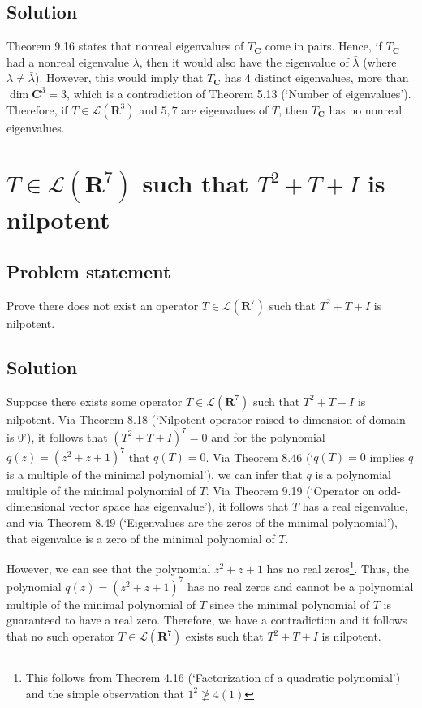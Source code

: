 \documentclass{article}
\begin{document}
\subsection*{Solution}
Theorem 9.16 states that nonreal eigenvalues of $T_{\mathbf{C}}$ come in pairs. 
Hence, if $T_{\mathbf{C}}$ had a nonreal eigenvalue $\lambda$, then it would also have the eigenvalue of $\bar{\lambda}$ (where $\lambda\neq\bar{\lambda}$). 
However, this would imply that $T_{\mathbf{C}}$ has 4 distinct eigenvalues, more than $\operatorname{dim}\mathbf{C}^3=3$, which is a contradiction of Theorem 5.13 (`Number of eigenvalues'). 
Therefore, if $T\in\mathcal{L}(\mathbf{R}^3)$ and $5,7$ are eigenvalues of $T$, then $T_{\mathbf{C}}$ has no nonreal eigenvalues.

\clearpage

\section{$T\in\mathcal{L}(\mathbf{R}^7)$ such that $T^2+T+I$ is nilpotent}
\subsection*{Problem statement}
Prove there does not exist an operator $T\in\mathcal{L}(\mathbf{R}^7)$ such that $T^2+T+I$ is nilpotent.

\subsection*{Solution}
Suppose there exists some operator $T\in\mathcal{L}(\mathbf{R}^7)$ such that $T^2+T+I$ is nilpotent. 
Via Theorem 8.18 (`Nilpotent operator raised to dimension of domain is $0$'), it follows that $(T^2+T+I)^7=0$ and for the polynomial $q(z)=(z^2+z+1)^7$ that $q(T)=0$. 
Via Theorem 8.46 (`$q(T)=0$ implies $q$ is a multiple of the minimal polynomial'), we can infer that $q$ is a polynomial multiple of the minimal polynomial of $T$. 
Via Theorem 9.19 (`Operator on odd-dimensional vector space has eigenvalue'), it follows that $T$ has a real eigenvalue, and via Theorem 8.49 (`Eigenvalues are the zeros of the minimal polynomial'), that eigenvalue is a zero of the minimal polynomial of $T$.

However, we can see that the polynomial $z^2+z+1$ has no real zeros\footnote{
This follows from Theorem 4.16 (`Factorization of a quadratic polynomial') and the simple observation that $1^2\ngeq 4(1)$
}. 
Thus, the polynomial $q(z)=(z^2+z+1)^7$ has no real zeros and cannot be a polynomial multiple of the minimal polynomial of $T$ since the minimal polynomial of $T$ is guaranteed to have a real zero. 
Therefore, we have a contradiction and it follows that no such operator $T\in\mathcal{L}(\mathbf{R}^7)$ exists such that $T^2+T+I$ is nilpotent.
\end{document}
